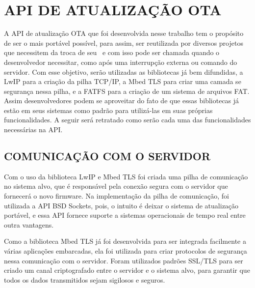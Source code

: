 
\section{API DE ATUALIZAÇÃO OTA}
\label{sec:API}

A API de atualização OTA que foi desenvolvida nesse trabalho tem o propósito de ser o mais portável possível, para assim, ser reutilizada por diversos projetos que necessitem da troca de seu \software\ e com isso pode ser chamada quando o desenvolvedor necessitar, como após uma interrupção externa ou comando do servidor. Com esse objetivo, serão utilizadas as bibliotecas já bem difundidas, a LwIP para a criação da pilha TCP/IP, a Mbed TLS para criar uma camada se segurança nessa pilha, e a FATFS para a criação de um sistema de arquivos FAT. Assim desenvolvedores podem se aproveitar do fato de que essas bibliotecas já estão em seus sistemas como padrão para utilizá-las em suas próprias funcionalidades. 
A seguir será retratado como serão cada uma das funcionalidades necessárias na API.

\subsection{COMUNICAÇÃO COM O SERVIDOR}

Com o uso da biblioteca LwIP e Mbed TLS foi criada uma pilha de comunicação no sistema alvo, que é responsável pela conexão segura com o servidor que fornecerá o novo firmware. Na implementação da pilha de comunicação, foi utilizada a API BSD Sockets, pois, o intuito é deixar o sistema de atualização portável, e essa API fornece suporte a sistemas operacionais de tempo real entre outra vantagens.

Como a biblioteca Mbed TLS já foi desenvolvida para ser integrada facilmente a várias aplicações embarcadas, ela foi utilizada para criar protocolos de segurança nessa comunicação com o servidor. Foram utilizados padrões SSL/TLS para ser criado um canal criptografado entre o servidor e o sistema alvo, para garantir que todos os dados transmitidos sejam sigilosos e seguros.

